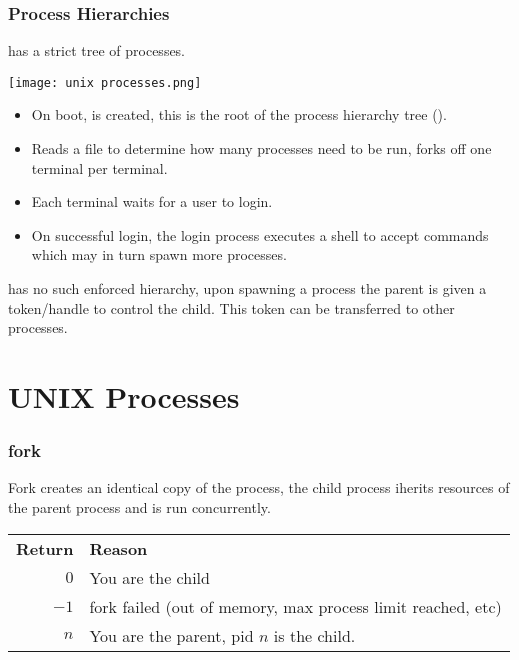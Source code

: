 \documentclass{report}
\begin{document}
        \subsubsection*{Process Hierarchies}
             has a strict tree of processes.
            \begin{center}
                \texttt{[image: unix processes.png]}
            \end{center}
            \begin{itemize}
                \item On boot,  is created, this is the root of the process hierarchy tree ().
                \item Reads a file to determine how many processes need to be run, forks off one terminal per terminal.
                \item Each terminal waits for a user to login.
                \item On successful login, the login process executes a shell to accept commands which may in turn spawn more processes.
            \end{itemize}
             has no such enforced hierarchy, upon spawning a process the parent is given a token/handle to control the child. This token can be transferred to other processes.
    \section*{UNIX Processes}
        \subsubsection*{fork}
            
            Fork creates an identical copy of the process, the child process iherits resources of the parent process and is run concurrently.
            \\\begin{tabular}{r l}
                \textbf{Return} & \textbf{Reason} \\
                $0$ & You are the child \\
                $-1$ & fork failed (out of memory, max process limit reached, etc) \\
                $n$ & You are the parent, pid $n$ is the child. \\
            \end{tabular}
            
\end{document}

